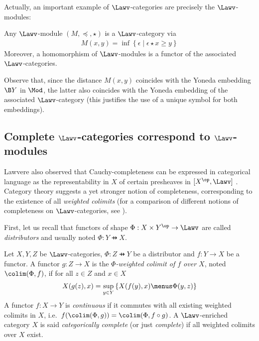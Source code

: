 Actually, an important example of $\Lawv$-categories are precisely the $\Lawv$-modules:

\begin{proposition}
Any $\Lawv$-module $(M,\preceq, \star)$ is a $\Lawv$-category via
\begin{align}
M(x,y) = \inf\left\{ \epsilon \mid \epsilon \star x\geq y\right\}
\end{align}
Moreover, a homomorphism of $\Lawv$-modules is a functor of the associated $\Lawv$-categories.
\end{proposition}

Observe that, since the distance $M(x,y)$ coincides with the Yoneda embedding $\B Y$ in $\Mod$, the latter also coincides with the Yoneda embedding of the associated $\Lawv$-category (this justifies the use of a unique symbol for both embeddings).


\subsection{Complete $\Lawv$-categories correspond to $\Lawv$-modules}

Lawvere also observed that Cauchy-completeness can be expressed in categorical language as the representability in $X$ of certain presheaves in $[X^{\op},\Lawv]$ \cite{Lawvere1973, Rutten1998}. Category theory suggests a yet stronger notion of completeness, corresponding to the existence of all \emph{weighted colimits} (for a comparison of different notions of completeness on $\Lawv$-categories, see \cite{Willerton2013, Rutten1998}).

First, let us recall that functors of shape $\Phi: X\times Y^{\op}\to \Lawv$ are called \emph{distributors} and usually noted $\Phi: Y \pfun X$.


\begin{definition}
Let $X,Y,Z$ be $\Lawv$-categories,
$\Phi: Z\pfun Y$ be a distributor and  $f:Y\to X$ be a functor.
A functor $g:Z\to X$ is the \emph{$\Phi$-weighted colimit of $f$ over $X$}, noted $\colim(\Phi,f)$, if for all $z\in Z$ and $x\in X$
\begin{align}
X(g(z),x)= \sup_{y\in Y}\left\{X(f(y),x)\menus \Phi(y,z)\right\}
\end{align} 
A functor $f:X\to Y$ is \emph{continuous} if it commutes with all existing weighted colimits in $X$, i.e.~$f(\colim(\Phi,g))=\colim(\Phi,f\circ g)$. A $\Lawv$-enriched category 
$X$ is said \emph{categorically complete} (or just \emph{complete}) if all weighted colimits over $X$ exist. 
\end{definition}

